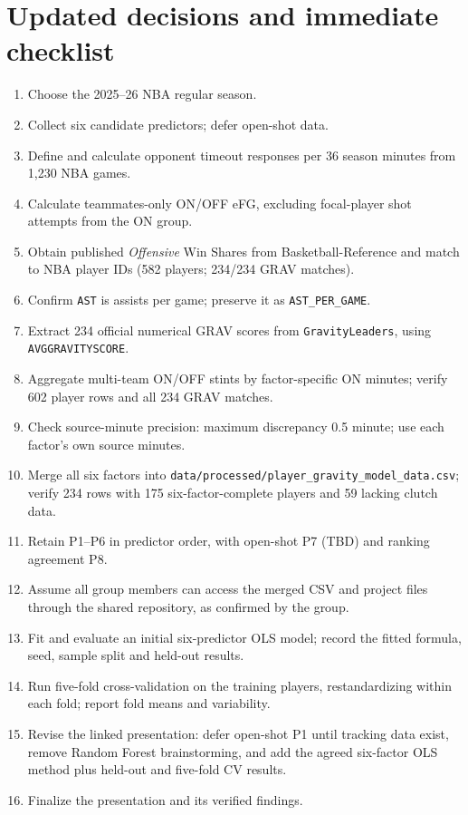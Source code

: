 \documentclass[11pt]{article}
\begin{document}
\section{Updated decisions and immediate checklist}
\begin{enumerate}
\item[$\boxtimes$] Choose the 2025--26 NBA regular season.
\item[$\boxtimes$] Collect six candidate predictors; defer open-shot data.
\item[$\boxtimes$] Define and calculate opponent timeout responses per 36
season minutes from 1,230 NBA games.
\item[$\boxtimes$] Calculate teammates-only ON/OFF eFG, excluding focal-player
shot attempts from the ON group.
\item[$\boxtimes$] Obtain published \emph{Offensive} Win Shares from
Basketball-Reference and match to NBA player IDs (582 players; 234/234 GRAV matches).
\item[$\boxtimes$] Confirm \texttt{AST} is assists per game; preserve it as
\texttt{AST\_PER\_GAME}.
\item[$\boxtimes$] Extract 234 official numerical GRAV scores from
\texttt{GravityLeaders}, using \texttt{AVGGRAVITYSCORE}.
\item[$\boxtimes$] Aggregate multi-team ON/OFF stints by factor-specific
ON minutes; verify 602 player rows and all 234 GRAV matches.
\item[$\boxtimes$] Check source-minute precision: maximum discrepancy
0.5 minute; use each factor's own source minutes.
\item[$\boxtimes$] Merge all six factors into
\texttt{data/processed/player\_gravity\_model\_data.csv}; verify 234 rows
with 175 six-factor-complete players and 59 lacking clutch data.
\item[$\boxtimes$] Retain P1--P6 in predictor order, with open-shot P7
(TBD) and ranking agreement P8.
\item[$\boxtimes$] Assume all group members can access the merged CSV and
project files through the shared repository, as confirmed by the group.
\item[$\boxtimes$] Fit and evaluate an initial six-predictor OLS model;
record the fitted formula, seed, sample split and held-out results.
\item[$\boxtimes$] Run five-fold cross-validation on the training players,
restandardizing within each fold; report fold means and variability.
\item[$\square$] Revise the linked presentation: defer open-shot P1 until
tracking data exist, remove Random Forest brainstorming, and add the agreed
six-factor OLS method plus held-out and five-fold CV results.
\item[$\square$] Finalize the presentation and its verified findings.
\end{enumerate}
\end{document}
